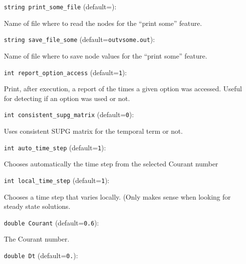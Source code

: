 \item\verb+string print_some_file+ {\rm(default=\verb||)}:

Name of file where to read the nodes for the ``print some'' 
feature. 

\item\verb+string save_file_some+ {\rm(default=\verb|outvsome.out|)}:

Name of file where to save node values for the ``print some'' 
feature. 

\item\verb+int report_option_access+ {\rm(default=\verb|1|)}:

Print, after execution, a report of the times a given option
was accessed. Useful for detecting if an option was used or not.

\item\verb+int consistent_supg_matrix+ {\rm(default=\verb|0|)}:

Uses consistent SUPG matrix for the temporal term or not. 

\item\verb+int auto_time_step+ {\rm(default=\verb|1|)}:

Chooses automatically the time step from the 
selected Courant number

\item\verb+int local_time_step+ {\rm(default=\verb|1|)}:

Chooses a time step that varies locally. (Only makes sense
when looking for steady state solutions. 

\item\verb+double Courant+ {\rm(default=\verb|0.6|)}:

The Courant number.

\item\verb+double Dt+ {\rm(default=\verb|0.|)}:

